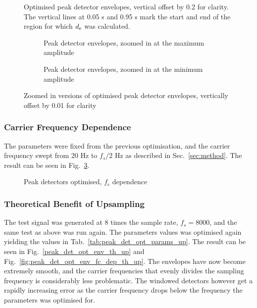 \documentclass[../main2.tex]{subfiles}
\providecommand{\rootdir}{..}
\begin{document}
\begin{figure}[h]
\centerline{}
\caption{Optimised peak detector envelopes, vertical offset by 0.2 for clarity. The vertical lines at 0.05 s and 0.95 s mark the start and end of the region for which $d_\text{e}$ was calculated.}
\label{fig:peak_det_opt_env}
\end{figure}
\begin{figure}

\captionsetup{justification=centering}
\begin{subfigure}{\linewidth}
\centering
\centerline{}
\caption{Peak detector envelopes, zoomed in at the maximum amplitude}
\end{subfigure}

\par\bigskip

\captionsetup{justification=centering}
\begin{subfigure}{\linewidth}
\centering
\centerline{}
\caption{Peak detector envelopes, zoomed in at the minimum amplitude}
\end{subfigure}

\caption{Zoomed in versions of optimised peak detector envelopes, vertically offset by 0.01 for clarity}
\label{fig:peak_det_opt_env_zoom}
\end{figure}

\subsubsection{Carrier Frequency Dependence}
The parameters were fixed from the previous optimisation, and the carrier frequency swept from 20 Hz to $f_s/2$ Hz as described in Sec.~\ref{sec:method}. The result can be seen in Fig.~\ref{fig:peak_det_opt_env_fc_dep}.

\begin{figure}[h]
\centerline{}
\caption{Peak detectors optimised, $f_c$ dependence}
\label{fig:peak_det_opt_env_fc_dep}
\end{figure}

\FloatBarrier
\subsubsection{Theoretical Benefit of Upsampling}
The test signal was generated at 8 times the sample rate, $f_s = 8000$, and the same test as above was run again. The parameters values was optimised again yielding the values in Tab.~\ref{tab:peak_det_opt_params_up}. The result can be seen in Fig.~\ref{peak_det_opt_env_th_up} and Fig.~\ref{fig:peak_det_opt_env_fc_dep_th_up}.
The envelopes have now become extremely smooth, and the carrier frequencies that evenly divides the sampling frequency is considerably less problematic. The windowed detectors however get a rapidly increasing error as the carrier frequency drops below the frequency the parameters was optimised for.
\end{document}
